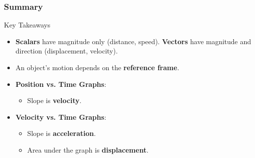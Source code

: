 \documentclass{beamer}
\begin{document}
\begin{frame}
\frametitle{Summary}
\begin{block}{Key Takeaways}
    \begin{itemize}
        \item \textbf{Scalars} have magnitude only (distance, speed). \textbf{Vectors} have magnitude and direction (displacement, velocity). \pause
        \item An object's motion depends on the \textbf{reference frame}. \pause
        \item \textbf{Position vs. Time Graphs}:
        \begin{itemize}
            \item \alert{Slope} is \textbf{velocity}.
        \end{itemize} \pause
        \item \textbf{Velocity vs. Time Graphs}:
        \begin{itemize}
            \item \alert{Slope} is \textbf{acceleration}.
            \item \alert{Area under the graph} is \textbf{displacement}.
        \end{itemize}
    \end{itemize}
\end{block}
\end{frame}
\end{document}
